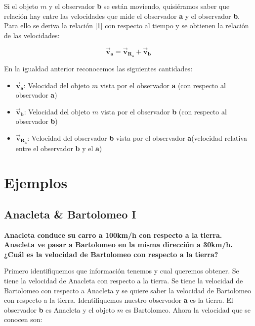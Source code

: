 \documentclass[a4paper,11pt]{article}
\begin{document}
	
	Si el objeto $m$ y el observador \textbf{b} se están moviendo, quisiéramos saber que relación hay entre las velocidades que mide el observador \textbf{a} y el observador \textbf{b}. Para ello se deriva la relación \ref{1} con respecto al tiempo y se obtienen la relación de las velocidades:
	
	\begin{equation}\label{2}
	\vec{\textbf{v}}_{\textbf{a}} = \vec{\textbf{v}}_{\textbf{R}_\textbf{a}} + \vec{\textbf{v}}_{\textbf{b}}
	\end{equation}
	
	En la igualdad anterior reconocemos las siguientes cantidades:
	
	\begin{itemize}
		\item $\vec{\textbf{v}}_{\textbf{a}}$: Velocidad del objeto $m$ vista por el observador \textbf{a} (con respecto al observador \textbf{a})
		\item $\vec{\textbf{v}}_{\textbf{b}}$: Velocidad del objeto $m$ vista por el observador \textbf{b} (con respecto al observador \textbf{b})
		\item $\vec{\textbf{v}}_{\textbf{R}_\textbf{a}}$: Velocidad del observador \textbf{b} vista por el observador \textbf{a}(velocidad relativa entre el observador \textbf{b} y el \textbf{a})
	\end{itemize}
	
	\section{Ejemplos}
	
		\color{pb}
	\subsection{Anacleta \& Bartolomeo I}
	
	\textbf{Anacleta conduce su carro a 100km/h con respecto a la tierra. Anacleta ve pasar a Bartolomeo en la misma dirección  a 30km/h. ¿Cuál es la velocidad de Bartolomeo con respecto a la tierra?}\\	\color{black}
	
	
	
	Primero identifiquemos que información tenemos y cual queremos obtener. Se tiene la velocidad de Anacleta con respecto a la tierra. Se tiene la velocidad de Bartolomeo con respecto a Anacleta y se quiere saber la velocidad de Bartolomeo con respecto a la tierra. Identifiquemos nuestro observador \textbf{a} es la tierra. El observador \textbf{b} es Anacleta y el objeto $m$ es Bartolomeo. Ahora la velocidad que se conocen son:
	
\end{document}
